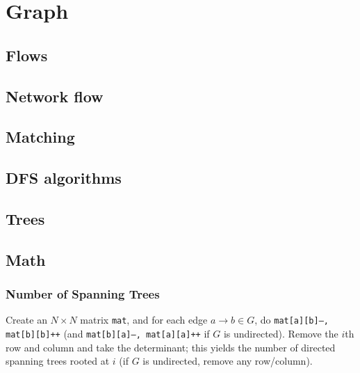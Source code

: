 \chapter{Graph}

\section{Flows}

\section{Network flow}

\section{Matching}

\section{DFS algorithms}

\section{Trees}

\section{Math}
	\subsection{Number of Spanning Trees}
		Create an $N\times N$ matrix \texttt{mat}, and for each edge $a \rightarrow b \in G$, do
		\texttt{mat[a][b]--, mat[b][b]++} (and \texttt{mat[b][a]--, mat[a][a]++} if $G$ is undirected).
		Remove the $i$th row and column and take the determinant; this yields the number of directed spanning trees rooted at $i$
		(if $G$ is undirected, remove any row/column).

